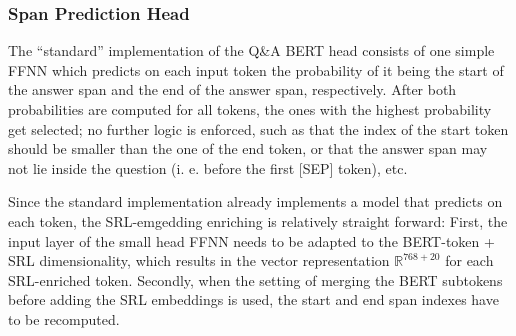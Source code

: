 \subsubsection{Span Prediction Head}

The ``standard'' implementation of the Q\&A BERT head consists of one simple FFNN which predicts
on each input token the probability of it being the start of the answer span and the end of the
answer span, respectively. After both probabilities are computed for all tokens, the ones with
the highest probability get selected; no further logic is enforced, such as that the index of
the start token should be smaller than the one of the end token, or that the answer span may
not lie inside the question (i. e. before the first [SEP] token), etc.

Since the standard implementation already implements a model that predicts on each token,
the SRL-emgedding enriching is relatively straight forward:
First, the input layer of the small head FFNN needs to be adapted to the BERT-token + SRL
dimensionality, which results in the vector representation $\mathbb{R}^{768+20}$ for each
SRL-enriched token. Secondly, when the setting of merging the BERT subtokens before adding
the SRL embeddings is used, the start and end span indexes have to be recomputed.





